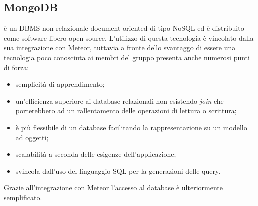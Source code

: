 \subsection{MongoDB}
 è un DBMS non relazionale document-oriented di tipo NoSQL ed è distribuito come software libero open-source. L'utilizzo di questa tecnologia è vincolato dalla sua integrazione con Meteor, tuttavia a fronte dello svantaggo di essere una tecnologia poco conosciuta ai membri del gruppo presenta anche numerosi punti di forza:
\begin{itemize}
	\item semplicità di apprendimento;
	\item un'efficienza superiore ai database relazionali non esistendo \textit{join} che porterebbero ad un rallentamento delle operazioni di lettura o scrittura; 
	\item è più flessibile di un database  facilitando la rappresentazione su un modello ad oggetti;
	\item scalabilità a seconda delle esigenze dell'applicazione;
	\item svincola dall'uso del linguaggio SQL per la generazioni delle query.
\end{itemize}
Grazie all'integrazione con Meteor l'accesso al database è ulteriormente semplificato.

